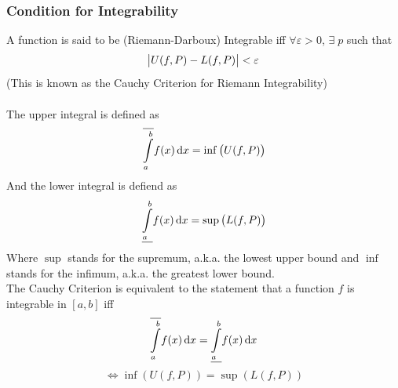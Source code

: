 \documentclass[14]{article}
\theoremstyle{definition}
\theoremstyle{case}
\begin{document}
\subsubsection{Condition for Integrability}
A function is said to be (Riemann-Darboux) Integrable iff $\forall \varepsilon > 0$, $\exists\; p$ such that
\[\abs{U(f, P) - L(f, P)} < \varepsilon\]
(This is known as the Cauchy Criterion for Riemann Integrability)\\\\
The upper integral is defined as
\[\overline{\int\limits_a^b} f(x) \dif x = \inf\left(U(f, P)\right)\]
And the lower integral is defiend as
\[\underline{\int\limits_a^b} f(x) \dif x = \sup\left(L(f, P)\right)\]
Where $\sup$ stands for the supremum, a.k.a. the lowest upper bound and $\inf$ stands for the infimum, a.k.a. the greatest lower bound.\\
The Cauchy Criterion is equivalent to the statement that a function $f$ is integrable in $[a, b]$ iff
\[\overline{\int\limits_a^b} f(x) \dif x = \underline{\int\limits_a^b} f(x) \dif x \]
\[\Leftrightarrow \inf\left( U(f, P) \right) = \sup\left( L(f, P) \right)\]
\end{document}
